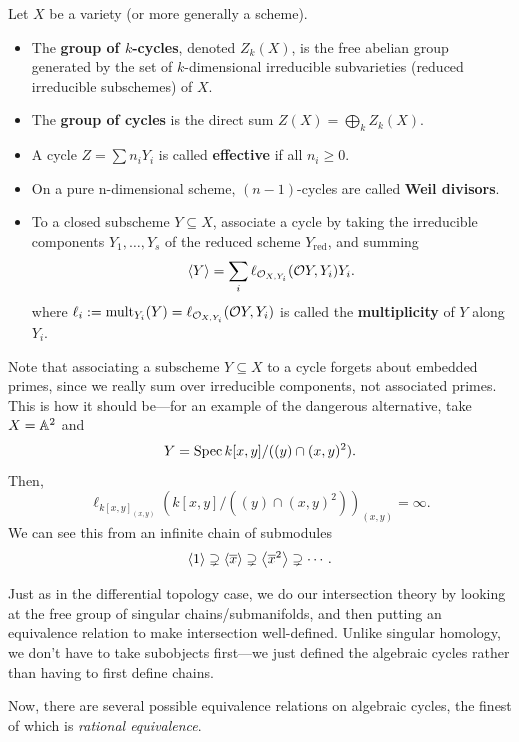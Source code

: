 \documentclass[12pt]{article}
\begin{document}
\begin{defn}
    Let $X$ be a variety (or more generally a scheme).
    \begin{itemize}
        \item The \textbf{group of $k$-cycles}, denoted $Z_k(X)$, is the free abelian group generated by the set of $k$-dimensional irreducible subvarieties (reduced irreducible subschemes) of $X$.
        \item The \textbf{group of cycles} is the direct sum $Z(X) = \bigoplus_k Z_k(X)$.
        \item A cycle $Z=\sum n_i Y_i$ is called \textbf{effective} if all $n_i\geq 0$.
        \item On a pure n-dimensional scheme, $(n-1)$-cycles are called \textbf{Weil divisors}.
        \item To a closed subscheme $Y\subseteq X$, associate a cycle by taking the irreducible components $Y_1,\dots,Y_s$ of the reduced scheme $Y_{\mathrm{red}}$, and summing
        \[\left\langle Y\right\rangle = \sum_i \ell_{\mathcal{O}_{X,Y_i}}(\mathcal{O}{Y,Y_i}) Y_i.\]
        where $\ell_i := \operatorname{mult}_{Y_i}(Y) = \ell_{\mathcal{O}_{X,Y_i}}(\mathcal{O}{Y,Y_i})$ is called the \textbf{multiplicity} of $Y$ along $Y_i$.
    \end{itemize}
\end{defn}

\begin{rmk}
    Note that associating a subscheme $Y\subseteq X$ to a cycle forgets about embedded primes, since we really sum over irreducible components, not associated primes. This is how it should be---for an example of the dangerous alternative, take $X=\mathbb{A}^2$ and
    \[Y = \operatorname{Spec} k[x,y]/((y)\cap (x,y)^2).\]
    Then,
    \[\ell_{k[x,y]_{(x,y)}} (k[x,y]/((y)\cap (x,y)^2))_{(x,y)} = \infty.\]
    We can see this from an infinite chain of submodules
    \[\left\langle1\right\rangle \supsetneq \left\langle\overline{x}\right\rangle \supsetneq \left\langle\overline{x}^2\right\rangle \supsetneq \cdots.\]
\end{rmk}

Just as in the differential topology case, we do our intersection theory by looking at the free group of singular chains/submanifolds, and then putting an equivalence relation to make intersection well-defined. Unlike singular homology, we don't have to take subobjects first---we just defined the algebraic cycles rather than having to first define chains.

Now, there are several possible equivalence relations on algebraic cycles, the finest of which is \textit{rational equivalence}.
\end{document}
